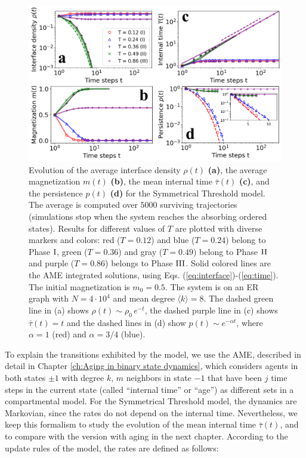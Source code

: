 \begin{figure}[ht]
	\centering \captionsetup{font=sf}
	\includegraphics[width=\textwidth]{Figs/Aging_STM/FIG3.pdf}
	\caption[Symmetrical Threshold model dynamics in random networks]{\label{fig:evolution_random} Evolution of the average interface density $\rho(t)$ \textbf{(a)}, the average magnetization $m(t)$ \textbf{(b)}, the mean internal time $\bar{\tau}(t)$ \textbf{(c)}, and the persistence $p(t)$ \textbf{(d)} for the Symmetrical Threshold model. The average is computed over $5000$ surviving trajectories (simulations stop when the system reaches the absorbing ordered states). Results for different values of $T$ are plotted with diverse markers and colors: red ($T = 0.12$) and blue ($T = 0.24$) belong to Phase ${\rm I}$, green ($T = 0.36$) and gray ($T = 0.49$) belong to Phase ${\rm II}$ and purple ($T = 0.86$) belongs to Phase ${\rm III}$. Solid colored lines are the AME integrated solutions, using Eqs. (\ref{eq:interface})-(\ref{eq:time}). The initial magnetization is $m_0 = 0.5$. The system is on an ER graph with $N = 4 \cdot 10^4$ and mean degree $\langle k \rangle = 8$. The dashed green line in (a) shows $\rho(t) \sim \rho_0 \, e^{-t}$, the dashed purple line in (c) shows $\bar{\tau}(t) = t$ and the dashed lines in (d) show $p(t) \sim e^{-\alpha t}$, where $\alpha = 1$ (red) and $\alpha = 3/4$ (blue). 
	}
\end{figure}
To explain the transitions exhibited by the model, we use the AME, described in detail in Chapter \ref{ch:Aging in binary state dynamics}, which considers agents in both states $\pm 1$ with degree $k$, $m$ neighbors in state $-1$ that have been $j$ time steps in the current state (called ``internal time'' or ``age'') as different sets in a compartmental model. For the Symmetrical Threshold model, the dynamics are Markovian, since the rates do not depend on the internal time. Nevertheless, we keep this formalism to study the evolution of the mean internal time $\bar{\tau}(t)$, and to compare with the version with aging in the next chapter. According to the update rules of the model, the rates are defined as follows:
